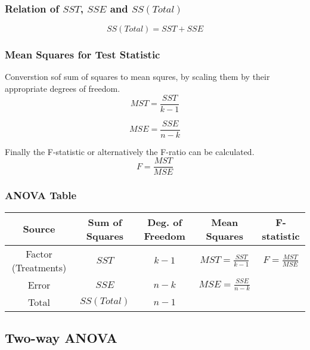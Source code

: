 \documentclass{article}
\begin{document}
\subsubsection{Relation of $SST$, $SSE$ and $SS(Total)$}

$$
SS(Total) = SST + SSE
$$

\subsubsection{Mean Squares for Test Statistic}
Converstion sof sum of squares to mean squres, by scaling them by their appropriate degrees of freedom.
$$
MST = \frac{SST}{k -1}
$$

$$
MSE = \frac{SSE}{n - k}
$$

Finally the F-statistic or alternatively the F-ratio can be calculated.
$$
F = \frac{MST}{MSE}
$$

\subsubsection{ANOVA Table}

\begin{center}
\begin{tabular}{ c c c c c }
 \hline
 Source & Sum of Squares & Deg. of Freedom & Mean Squares & F-statistic\\ 
 \hline
 Factor (Treatments) & $SST$ & $k - 1$ & $MST = \frac{SST}{k-1}$ & $F = \frac{MST}{MSE}$\\  
 Error & $SSE$ & $n - k$ & $MSE = \frac{SSE}{n - k}$    \\
  \hline
 Total & $SS(Total)$ & $n -1$
\end{tabular}
\end{center}

\subsection{Two-way ANOVA}
\end{document}
